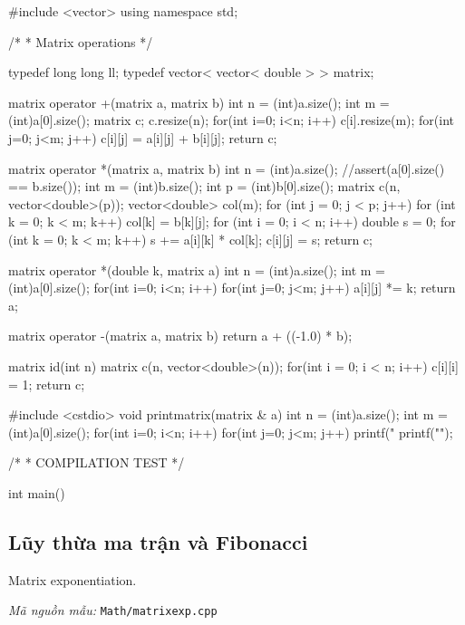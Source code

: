 \documentclass[11pt]{article}
\newcommand{\codepath}[1]{\par\noindent\textit{Mã nguồn mẫu:} \texttt{#1}\par}
\begin{document}
\begingroup\scriptsize
\begin{vncode}
#include <vector>
using namespace std;

/*
 * Matrix operations
 */

typedef long long ll;
typedef vector< vector< double > > matrix;

matrix operator +(matrix a, matrix b) {
	int n = (int)a.size();
	int m = (int)a[0].size();
	matrix c;
	c.resize(n);
	for(int i=0; i<n; i++) {
		c[i].resize(m);
		for(int j=0; j<m; j++)
			c[i][j] = a[i][j] + b[i][j];
	}
	return c;
}

matrix operator *(matrix a, matrix b) {
	int n = (int)a.size();
	//assert(a[0].size() == b.size());
	int m = (int)b.size();
	int p = (int)b[0].size();
	matrix c(n, vector<double>(p));
	vector<double> col(m);
	for (int j = 0; j < p; j++) {
		for (int k = 0; k < m; k++)
			col[k] = b[k][j];
		for (int i = 0; i < n; i++) {
			double s = 0;
			for (int k = 0; k < m; k++)
				s += a[i][k] * col[k];
			c[i][j] = s;
		}
	}
	return c;
}

matrix operator *(double k, matrix a) {
	int n = (int)a.size();
	int m = (int)a[0].size();
	for(int i=0; i<n; i++) for(int j=0; j<m; j++)
		a[i][j] *= k;
	return a;
}

matrix operator -(matrix a, matrix b) {
	return a + ((-1.0) * b);
}

matrix id(int n) {
	matrix c(n, vector<double>(n));
	for(int i = 0; i < n; i++) c[i][i] = 1;
	return c;
}

#include <cstdio>
void printmatrix(matrix & a) {
	int n = (int)a.size();
	int m = (int)a[0].size();
	for(int i=0; i<n; i++) {
		for(int j=0; j<m; j++) {
			printf("%
		}
		printf("\n");
	}
}

/*
 * COMPILATION TEST
 */

int main() {}
\end{vncode}
\endgroup


\subsection{Lũy thừa ma trận và Fibonacci}

Matrix exponentiation.

\codepath{Math/matrixexp.cpp}
\end{document}
